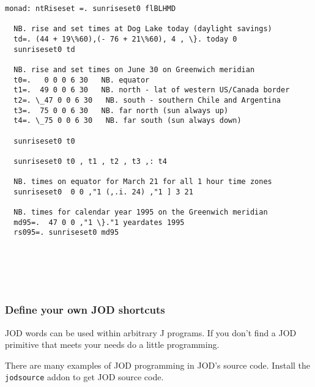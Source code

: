\documentclass[11pt,letter,landscape]{article}
\begin{document}
\begin{Verbatim}[commandchars=\\\{\}]
monad: ntRiseset =. sunriseset0 flBLHMD

  NB. rise and set times at Dog Lake today (daylight savings)
  td=. (44 + 19\%60),(- 76 + 21\%60), 4 , \}. today 0
  sunriseset0 td

  NB. rise and set times on June 30 on Greenwich meridian
  t0=.   0 0 0 6 30   NB. equator
  t1=.  49 0 0 6 30   NB. north - lat of western US/Canada border
  t2=. \_47 0 0 6 30   NB. south - southern Chile and Argentina
  t3=.  75 0 0 6 30   NB. far north (sun always up)
  t4=. \_75 0 0 6 30   NB. far south (sun always down)

  sunriseset0 t0

  sunriseset0 t0 , t1 , t2 , t3 ,: t4

  NB. times on equator for March 21 for all 1 hour time zones
  sunriseset0  0 0 ,"1 (,.i. 24) ,"1 ] 3 21

  NB. times for calendar year 1995 on the Greenwich meridian
  md95=.  47 0 0 ,"1 \}."1 yeardates 1995
  rs095=. sunriseset0 md95






    \end{Verbatim}

    \subsubsection{Define your own JOD
shortcuts}\label{define-your-own-jod-shortcuts}

JOD words can be used within arbitrary J programs. If you don't find a
JOD primitive that meets your needs do a little programming.

There are many examples of JOD programming in JOD's source code. Install
the \texttt{jodsource} addon to get JOD source code.
\end{document}
